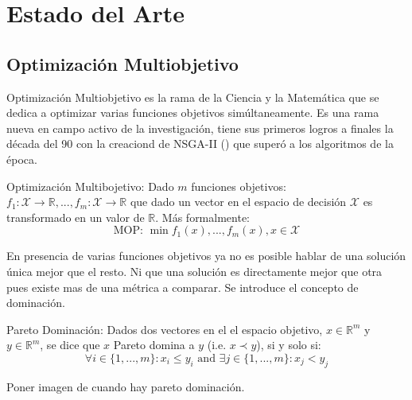 
\chapter{Estado del Arte}\label{chapter:state-of-the-art}

\section{Optimizaci\'on Multiobjetivo}

Optimizaci\'on Multiobjetivo es la rama de la Ciencia y la Matem\'atica que se dedica a optimizar varias funciones objetivos sim\'ultaneamente. Es una rama nueva en campo activo de la investigaci\'on, tiene sus primeros logros a finales la d\'ecada del 90 con la creaciond de NSGA-II (\cite{deb2002fast}) que super\'o a los algoritmos de la \'epoca.
 
\begin{definition}{Optimizaci\'on Multibojetivo:}
     Dado $m$ funciones objetivos: $f_1: \mathcal{X} \rightarrow \mathbb{R}, ..., f_m: \mathcal{X} \rightarrow \mathbb{R}$ que dado un vector en el espacio de decisi\'on $\mathcal{X}$ es transformado en un valor de $\mathbb{R}$. M\'as formalmente:
    \begin{equation*}
        \text{MOP: }\min f_1(x), ..., f_m(x), x \in \mathcal{X}
    \end{equation*}
\end{definition}

En presencia de varias funciones objetivos ya no es posible hablar de una soluci\'on \'unica mejor que el resto. Ni que una soluci\'on es directamente mejor que otra pues existe mas de una m\'etrica a comparar. Se introduce el concepto de dominaci\'on.

\begin{definition}{Pareto Dominaci\'on:}
    Dados dos vectores en el el espacio objetivo, $x \in \mathbb{R}^m$ y $y \in \mathbb{R}^m$, se dice que $x$ Pareto domina a $y$ (i.e. $x \prec y$), si y solo si:
    \begin{equation*}
        \forall i \in \{1, ..., m\}: x_i \leq y_i \text{ and } \exists j \in \{1, ..., m\}: x_j < y_j 
    \end{equation*}
\end{definition}

Poner imagen de cuando hay pareto dominaci\'on.

